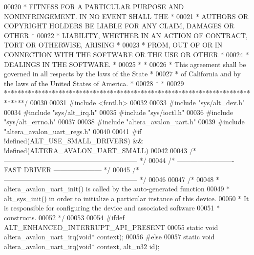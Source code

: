 \begin{DoxyCode}
00020 \textcolor{comment}{* FITNESS FOR A PARTICULAR PURPOSE AND NONINFRINGEMENT. IN NO EVENT SHALL THE *}
00021 \textcolor{comment}{* AUTHORS OR COPYRIGHT HOLDERS BE LIABLE FOR ANY CLAIM, DAMAGES OR OTHER      *}
00022 \textcolor{comment}{* LIABILITY, WHETHER IN AN ACTION OF CONTRACT, TORT OR OTHERWISE, ARISING     *}
00023 \textcolor{comment}{* FROM, OUT OF OR IN CONNECTION WITH THE SOFTWARE OR THE USE OR OTHER         *}
00024 \textcolor{comment}{* DEALINGS IN THE SOFTWARE.                                                   *}
00025 \textcolor{comment}{*                                                                             *}
00026 \textcolor{comment}{* This agreement shall be governed in all respects by the laws of the State   *}
00027 \textcolor{comment}{* of California and by the laws of the United States of America.              *}
00028 \textcolor{comment}{*                                                                             *}
00029 \textcolor{comment}{******************************************************************************/}
00030 
00031 \textcolor{preprocessor}{#include <fcntl.h>}
00032 
00033 \textcolor{preprocessor}{#include "sys/alt_dev.h"}
00034 \textcolor{preprocessor}{#include "sys/alt_irq.h"}
00035 \textcolor{preprocessor}{#include "sys/ioctl.h"}
00036 \textcolor{preprocessor}{#include "sys/alt_errno.h"}
00037 
00038 \textcolor{preprocessor}{#include "altera_avalon_uart.h"}
00039 \textcolor{preprocessor}{#include "altera_avalon_uart_regs.h"}
00040 
00041 \textcolor{preprocessor}{#if !defined(ALT\_USE\_SMALL\_DRIVERS) && !defined(ALTERA\_AVALON\_UART\_SMALL)}
00042 
00043 \textcolor{comment}{/* ----------------------------------------------------------- */}
00044 \textcolor{comment}{/* ------------------------- FAST DRIVER --------------------- */}
00045 \textcolor{comment}{/* ----------------------------------------------------------- */}
00046 
00047 \textcolor{comment}{/*}
00048 \textcolor{comment}{ * altera\_avalon\_uart\_init() is called by the auto-generated function }
00049 \textcolor{comment}{ * alt\_sys\_init() in order to initialize a particular instance of this device.}
00050 \textcolor{comment}{ * It is responsible for configuring the device and associated software }
00051 \textcolor{comment}{ * constructs.}
00052 \textcolor{comment}{ */}
00053 
00054 \textcolor{preprocessor}{#ifdef ALT\_ENHANCED\_INTERRUPT\_API\_PRESENT}
00055 \textcolor{keyword}{static} \textcolor{keywordtype}{void} altera_avalon_uart_irq(\textcolor{keywordtype}{void}* context);
00056 \textcolor{preprocessor}{#else}
00057 \textcolor{keyword}{static} \textcolor{keywordtype}{void} altera_avalon_uart_irq(\textcolor{keywordtype}{void}* context, alt_u32 \textcolor{keywordtype}{id});

\end{DoxyCode}
